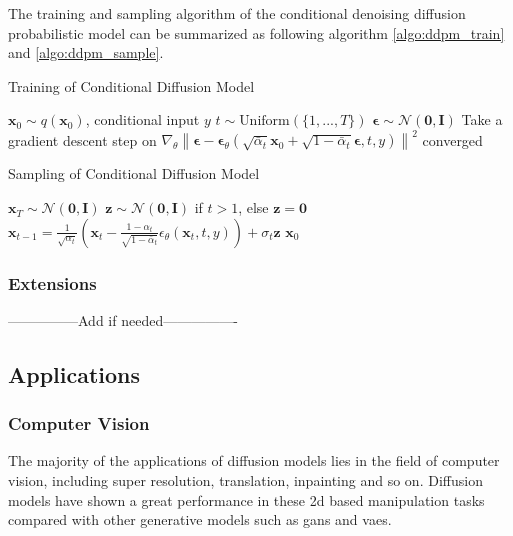 \documentclass[12pt,DIV14,BCOR12mm,a4paper,footinclude=false,headinclude,parskip=half-,twoside,openright,cleardoublepage=empty,toc=index,bibliography=totoc,listof=totoc]{scrreprt}
\numberwithin{equation}{chapter}
\begin{document}
The training and sampling algorithm of the conditional denoising diffusion probabilistic model can be summarized as following algorithm \ref{algo:ddpm_train} and \ref{algo:ddpm_sample}.
\begin{algorithm}[H]
  \caption{Training of Conditional Diffusion Model}
  \label{algo:ddpm_train}
  \begin{algorithmic}[1]
    \Repeat
      \State $\mathbf{x}_{0}\sim q(\mathbf{x}_{0})$, conditional input $y$
      \State $t\sim \text{Uniform}(\{1,...,T\})$
      \State $\mathbf{\epsilon}\sim \mathcal{N} (\mathbf{0}, \mathbf{I})$
      \State Take a gradient descent step on $\nabla_{\theta}\left\lVert\boldsymbol{\epsilon} - \boldsymbol{\epsilon}_{\theta}(\sqrt{\bar{\alpha}_{t}}\mathbf{x}_{0} + \sqrt{1 - \bar{\alpha}_{t}}\boldsymbol{\epsilon}, t, y)\right\rVert ^{2}$ 
    \Until converged
  \end{algorithmic}
\end{algorithm}
\begin{algorithm}[H]
  \caption{Sampling of Conditional Diffusion Model}
  \label{algo:ddpm_sample}
  \begin{algorithmic}[1]
    \State $\mathbf{x}_{T}\sim \mathcal{N} (\mathbf{0}, \mathbf{I})$
      \State $\mathbf{z}\sim \mathcal{N} (\mathbf{0}, \mathbf{I})$ if $t>1$, else $\mathbf{z} = \mathbf{0}$
      \State $\mathbf{x}_{t-1}=\frac{1}{\sqrt{\alpha_{t}}}\left(\mathbf{x}_{t} - \frac{1-\alpha_{t}}{\sqrt{1-\bar{\alpha}_{t}}}\epsilon_{\theta}(\mathbf{x}_{t},t,y)\right) + \sigma_{t}\mathbf{z}$
    \EndFor
    \State \Return $\mathbf{x}_{0}$
  \end{algorithmic}
\end{algorithm}
\subsubsection{Extensions}
---------------Add if needed----------------
\subsection{Applications}

\subsubsection{Computer Vision}
The majority of the applications of diffusion models lies in the field of computer vision, including super resolution, translation, inpainting and so on\cite{yang2023diffusion}. Diffusion models have shown a great performance in these \gls{2d} based manipulation tasks compared with other generative models such as \glspl{gan} and \glspl{vae}.
\end{document}
